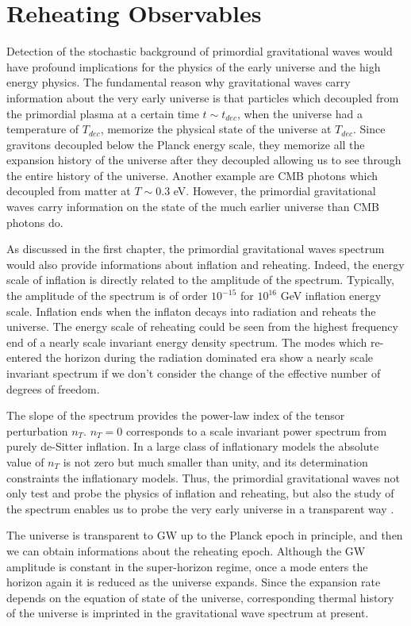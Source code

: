 \documentclass[11pt,a4paper,twoside]{book}
\begin{document}
\chapter{Reheating Observables}
Detection of the stochastic background of primordial gravitational waves would have profound implications for the physics of the early universe and the high energy physics. The fundamental reason why gravitational waves carry information about the very early universe is that particles which decoupled from the primordial plasma at a certain time $ t\sim t_{dec} $, when the universe had a temperature of $ T_{dec} $, memorize the physical state of the universe at $ T_{dec} $. Since gravitons decoupled below the Planck energy scale, they memorize all the expansion history of the universe after they decoupled  allowing us to see through the entire history of the universe. Another example are CMB photons which decoupled from matter at $ T\sim 0.3 $ eV. However, the primordial gravitational waves carry information on the state of the much earlier universe than CMB photons do.

As discussed in the first chapter, the primordial gravitational waves spectrum would also provide informations about inflation and reheating. Indeed, the energy scale of inflation is directly related to the amplitude of the spectrum. Typically, the amplitude of the spectrum is of order $ 10^{-15} $ for $ 10^{16} $ GeV inflation energy scale. Inflation ends when the inflaton decays into radiation and reheats the universe. The energy scale of reheating could be seen from the highest frequency end of a nearly scale invariant energy density spectrum. The modes which re-entered the horizon during the radiation dominated era show a nearly scale invariant spectrum if we don't consider the change of the effective number of degrees of freedom.

The slope of the spectrum provides the power-law index of the tensor perturbation $ n_{T} $. $ n_{T}=0 $ corresponds to a scale invariant power spectrum from purely de-Sitter inflation. In a large class of inflationary models the absolute value of $ n_{T} $ is not zero but much smaller than unity, and its determination constraints the inflationary models. Thus, the  primordial gravitational waves not only test and probe the physics of inflation and reheating, but also the study of the spectrum enables us to probe the very early universe in a transparent way \cite{Chap3:GW_Watanabe_Komatsu}.

The universe is transparent to GW up to the Planck epoch in principle, and then we can obtain informations about the reheating epoch. Although the GW amplitude is constant  in the super-horizon regime, once a mode enters the horizon again it is reduced as the universe expands. Since the expansion rate depends on the equation of state of the universe, corresponding thermal history of the universe is imprinted in the gravitational wave spectrum at present.
\end{document}
